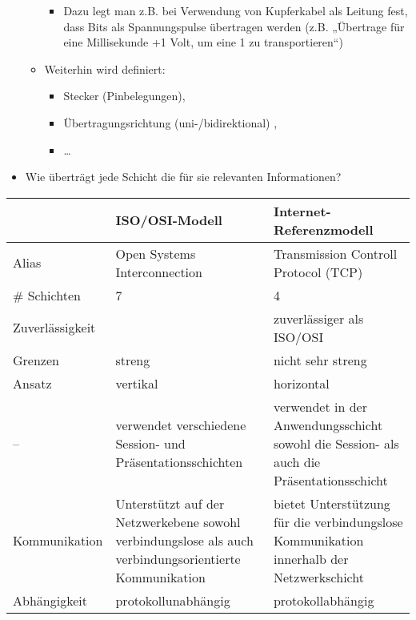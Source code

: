 \begin{itemize}
\begin{itemize}
        \begin{itemize}
            \item Dazu legt man z.B. bei Verwendung von Kupferkabel als Leitung fest, dass Bits als Spannungspulse übertragen werden (z.B. „Übertrage für eine Millisekunde +1 Volt, um eine 1 zu transportieren“)
        \end{itemize}
        \item Weiterhin wird definiert:
        \begin{itemize}
            \item Stecker (Pinbelegungen),
            \item Übertragungsrichtung (uni-/bidirektional) ,
            \item \ldots
        \end{itemize}
    \end{itemize}
\end{itemize}

\begin{itemize}
    \item {} Wie überträgt jede Schicht die für sie relevanten Informationen?
\end{itemize}

\bigbreak
\begin{tabularx}{\textwidth}{|X|X|X|}
    \hline
    & ISO/OSI-Modell & Internet-Referenzmodell \tabularnewline
    \hline
    Alias & Open Systems Interconnection & Transmission Controll Protocol (TCP) \tabularnewline
    \hline
    \# Schichten & 7 & 4 \tabularnewline
    \hline
    Zuverlässigkeit & & zuverlässiger als ISO/OSI \tabularnewline
    \hline
    Grenzen & streng & nicht sehr streng \tabularnewline
    \hline
    Ansatz & vertikal & horizontal \tabularnewline
    \hline
    – & verwendet verschiedene Session- und Präsentationsschichten & verwendet in der Anwendungsschicht sowohl die Session- als auch die Präsentationsschicht \tabularnewline
    \hline
    Kommunikation & Unterstützt auf der Netzwerkebene sowohl verbindungslose als auch verbindungsorientierte Kommunikation & bietet Unterstützung für die verbindungslose Kommunikation innerhalb der Netzwerkschicht \tabularnewline
    \hline
    Abhängigkeit & protokollunabhängig & protokollabhängig \tabularnewline
    \hline
\end{tabularx}

